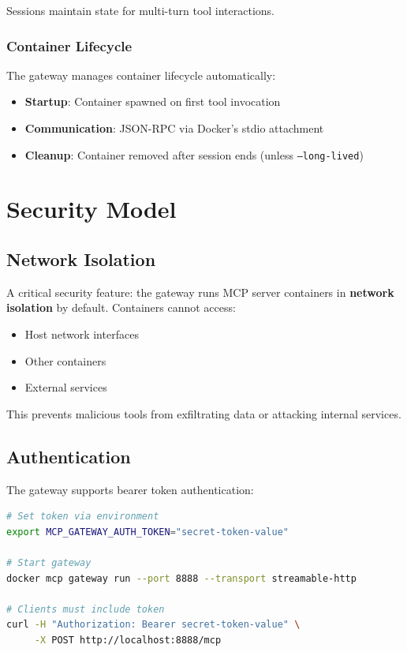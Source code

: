 \documentclass[11pt,letterpaper]{article}
\begin{document}
Sessions maintain state for multi-turn tool interactions.

\subsubsection{Container Lifecycle}

The gateway manages container lifecycle automatically:

\begin{itemize}[noitemsep]
    \item \textbf{Startup}: Container spawned on first tool invocation
    \item \textbf{Communication}: JSON-RPC via Docker's stdio attachment
    \item \textbf{Cleanup}: Container removed after session ends (unless \texttt{--long-lived})
\end{itemize}

\section{Security Model}

\subsection{Network Isolation}

A critical security feature: the gateway runs MCP server containers in \textbf{network isolation} by default. Containers cannot access:

\begin{itemize}[noitemsep]
    \item Host network interfaces
    \item Other containers
    \item External services
\end{itemize}

This prevents malicious tools from exfiltrating data or attacking internal services.

\subsection{Authentication}

The gateway supports bearer token authentication:

\begin{lstlisting}[language=bash,caption={Gateway Authentication}]
# Set token via environment
export MCP_GATEWAY_AUTH_TOKEN="secret-token-value"

# Start gateway
docker mcp gateway run --port 8888 --transport streamable-http

# Clients must include token
curl -H "Authorization: Bearer secret-token-value" \
     -X POST http://localhost:8888/mcp
\end{lstlisting}
\end{document}
